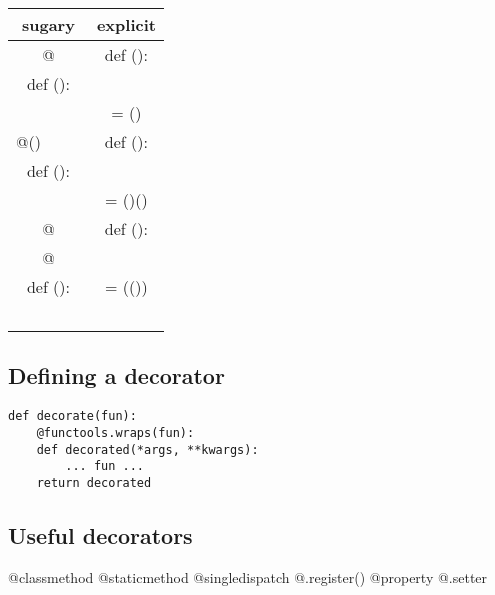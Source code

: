 \documentclass{refcard}
\begin{document}
\begin{tabular}{CC}
	\hline
	\textnormal{sugary}          & \textnormal{explicit}    \\[1ex]

	\hline
	@                & def ():                  \\
	def ():               & ~~                \\
	~~             &  = () \\[1ex]
	\hline

	@()~~~~~  & def ():                           \\
	def ():               & ~~                         \\
	~~             &  = ()() \\[1ex]
	\hline

	@                   & def ():                           \\
	@                   & ~~                         \\
	def ():               &  = (())  \\
	~~             &                                          \\
	\hline
\end{tabular}

\subsection{Defining a decorator}

\begin{verbatim}
def decorate(fun):
    @functools.wraps(fun):
    def decorated(*args, **kwargs):
        ... fun ...
    return decorated
\end{verbatim}

\subsection{Useful decorators}

\begin{ldesc}
	   @classmethod
	 @staticmethod
	 @singledispatch \li
	                                    @.register()
	 @property \li @.setter
\end{ldesc}
\end{document}
